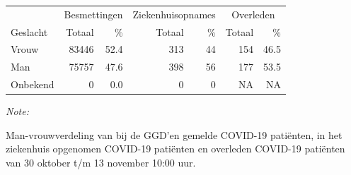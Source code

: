 \documentclass[
  english,
  man,floatsintext]{apa6}
\begin{document}
\begin{table}
\centering\begingroup\fontsize{11}{13}\selectfont

\begin{threeparttable}
\begin{tabular}{lrrrrrr}
\toprule
\multicolumn{1}{c}{ } & \multicolumn{2}{c}{Besmettingen} & \multicolumn{2}{c}{Ziekenhuisopnames} & \multicolumn{2}{c}{Overleden} \\
\cmidrule(l{3pt}r{3pt}){2-3} \cmidrule(l{3pt}r{3pt}){4-5} \cmidrule(l{3pt}r{3pt}){6-7}
Geslacht & Totaal & \% & Totaal & \% & Totaal & \%\\
\midrule
Vrouw & 83446 & 52.4 & 313 & 44 & 154 & 46.5\\
Man & 75757 & 47.6 & 398 & 56 & 177 & 53.5\\
Onbekend & 0 & 0.0 & 0 & 0 & NA & NA\\
\bottomrule
\end{tabular}
\begin{tablenotes}
\item \textit{Note: } 
\item Man-vrouwverdeling van bij de GGD’en gemelde COVID-19 patiënten, in het ziekenhuis opgenomen COVID-19 patiënten en overleden COVID-19 patiënten van 30 oktober t/m 13 november 10:00 uur.
\end{tablenotes}
\end{threeparttable}
\endgroup{}
\end{table}
\newpage
\end{document}
